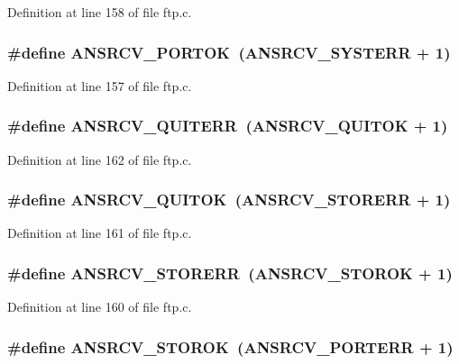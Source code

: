 Definition at line 158 of file ftp.c.

\hypertarget{group__ftp_ga24b535f4d97e4e04e57f55ad71c89ad1}{
\subsubsection[{ANSRCV\_\-PORTOK}]{\setlength{\rightskip}{0pt plus 5cm}\#define ANSRCV\_\-PORTOK~(ANSRCV\_\-SYSTERR + 1)}}
\label{group__ftp_ga24b535f4d97e4e04e57f55ad71c89ad1}


Definition at line 157 of file ftp.c.

\hypertarget{group__ftp_ga5f1a8e5f8462eb6f8788e7a200c318b4}{
\subsubsection[{ANSRCV\_\-QUITERR}]{\setlength{\rightskip}{0pt plus 5cm}\#define ANSRCV\_\-QUITERR~(ANSRCV\_\-QUITOK + 1)}}
\label{group__ftp_ga5f1a8e5f8462eb6f8788e7a200c318b4}


Definition at line 162 of file ftp.c.

\hypertarget{group__ftp_ga39cc057d93b388cc8b9a15ee259656cb}{
\subsubsection[{ANSRCV\_\-QUITOK}]{\setlength{\rightskip}{0pt plus 5cm}\#define ANSRCV\_\-QUITOK~(ANSRCV\_\-STORERR + 1)}}
\label{group__ftp_ga39cc057d93b388cc8b9a15ee259656cb}


Definition at line 161 of file ftp.c.

\hypertarget{group__ftp_ga06e928901b2fbf3c556b71f53c5f75bb}{
\subsubsection[{ANSRCV\_\-STORERR}]{\setlength{\rightskip}{0pt plus 5cm}\#define ANSRCV\_\-STORERR~(ANSRCV\_\-STOROK + 1)}}
\label{group__ftp_ga06e928901b2fbf3c556b71f53c5f75bb}


Definition at line 160 of file ftp.c.

\hypertarget{group__ftp_gac3320b3c2c43f63bd603b158d11ef645}{
\subsubsection[{ANSRCV\_\-STOROK}]{\setlength{\rightskip}{0pt plus 5cm}\#define ANSRCV\_\-STOROK~(ANSRCV\_\-PORTERR + 1)}}
\label{group__ftp_gac3320b3c2c43f63bd603b158d11ef645}


